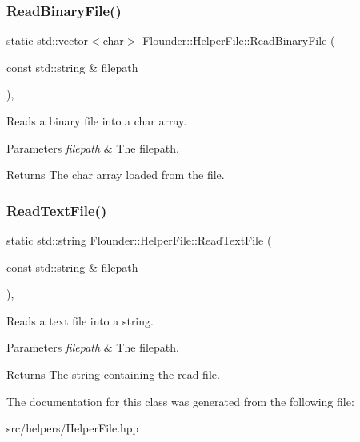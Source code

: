\subsubsection{\texorpdfstring{Read\+Binary\+File()}{ReadBinaryFile()}}
{\footnotesize\ttfamily static std\+::vector$<$char$>$ Flounder\+::\+Helper\+File\+::\+Read\+Binary\+File (\begin{DoxyParamCaption}\item[{const std\+::string \&}]{filepath }\end{DoxyParamCaption})\hspace{0.3cm}{\ttfamily [inline]}, {\ttfamily [static]}}



Reads a binary file into a char array. 


\begin{DoxyParams}{Parameters}
{\em filepath} & The filepath. \\
\hline
\end{DoxyParams}
\begin{DoxyReturn}{Returns}
The char array loaded from the file. 
\end{DoxyReturn}
\mbox{\label{class_flounder_1_1_helper_file_a81ff850b4da7b08a026ed24a59cbec97}} 
\subsubsection{\texorpdfstring{Read\+Text\+File()}{ReadTextFile()}}
{\footnotesize\ttfamily static std\+::string Flounder\+::\+Helper\+File\+::\+Read\+Text\+File (\begin{DoxyParamCaption}\item[{const std\+::string \&}]{filepath }\end{DoxyParamCaption})\hspace{0.3cm}{\ttfamily [inline]}, {\ttfamily [static]}}



Reads a text file into a string. 


\begin{DoxyParams}{Parameters}
{\em filepath} & The filepath. \\
\hline
\end{DoxyParams}
\begin{DoxyReturn}{Returns}
The string containing the read file. 
\end{DoxyReturn}


The documentation for this class was generated from the following file\+:\begin{DoxyCompactItemize}
\item 
src/helpers/Helper\+File.\+hpp\end{DoxyCompactItemize}
